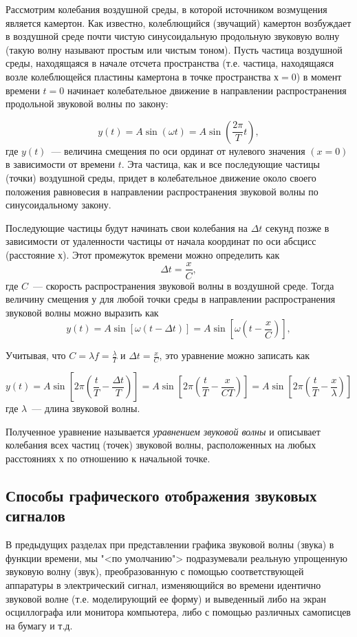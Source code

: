 \documentclass[oneside, final, 14pt]{extreport}
\begin{document}
Рассмотрим колебания воздушной среды, в которой источником возмущения является камертон. Как известно, колеблющийся (звучащий) камертон возбуждает в воздушной среде почти чистую синусоидальную продольную звуковую волну (такую волну называют простым или чистым тоном). Пусть частица воздушной среды, находящаяся в начале отсчета пространства (т.е. частица, находящаяся возле колеблющейся пластины камертона в
точке пространства \(х=0\)) в момент времени \(t=0\) начинает колебательное движение в направлении распространения продольной звуковой волны по закону:

\[y(t)=A\sin(\omega t) = A\sin(\frac{2\pi}{T}t),\]
где \(y(t)\)~--- величина смещения по оси ординат от нулевого значения \((x=0)\) в зависимости от времени \(t\). Эта частица, как и все последующие частицы (точки) воздушной среды, придет в колебательное движение около своего положения равновесия в направлении распространения звуковой волны по синусоидальному закону.

Последующие частицы будут начинать свои колебания на \(\Delta t\) секунд позже в зависимости от удаленности частицы от начала координат по оси абсцисс (расстояние \(х\)). Этот промежуток времени можно определить как
\[\Delta t=\frac{x}{C},\]
где \(C\)~---  скорость распространения звуковой волны в воздушной среде. Тогда величину смещения у для любой точки среды в направлении распространения звуковой волны можно выразить как
\[y(t)=A\sin[\omega (t-\Delta t)] = A\sin[\omega(t-\frac{x}{C})],\]

Учитывая, что \(C=\lambda f=\frac{\lambda}{T}\) и \(\Delta t=\frac{x}{C}\), это уравнение можно записать как

\[y(t) = A\sin[2\pi(\frac{t}{T}-\frac{\Delta t}{T})] = A\sin[2\pi(\frac{t}{T}-\frac{x}{CT})]=A\sin[2\pi(\frac{t}{T}-\frac{x}{\lambda})]\]
где \(\lambda\)~--- длина звуковой волны.

Полученное уравнение называется {\itshape уравнением звуковой волны} и описывает колебания всех частиц (точек) звуковой волны, расположенных на любых расстояниях \(х\) по отношению к начальной точке.

\subsection{Способы графического отображения звуковых сигналов}
В предыдущих разделах при представлении графика звуковой волны (звука) в функции времени, мы "<по умолчанию"> подразумевали реальную упрощенную звуковую волну (звук), преобразованную с помощью соответствующей аппаратуры в электрический сигнал, изменяющийся во времени идентично звуковой волне (т.е. моделирующий ее форму) и выведенный либо на экран осциллографа или монитора компьютера, либо с помощью различных самописцев на бумагу и т.д.
\end{document}
